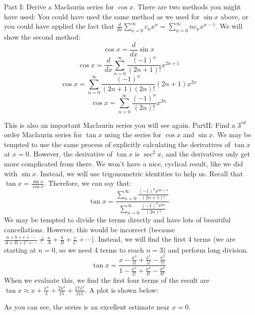 \begin{Answer}[ref = trigmac]
Part I: Derive a Maclaurin series for $\cos{x}$. There are two methods you 
might have used: You could have used the same method as we used for $\sin{x}$ 
above, or you could have applied the fact that $\frac{d}{dx} \sum_{n=0}^\infty 
c_n x^n = \sum_{n=0}^\infty n c_n x^{n - 1}$. We will show the second method:
$$\cos{x} = \frac{d}{dx} \sin{x}$$
$$\cos{x} = \frac{d}{dx} \sum_{n=0}^\infty \frac{(-1)^n}{(2n + 1)!}x^{2n + 1}$$
$$\cos{x} = \sum_{n=0}^\infty \frac{(-1)^n}{(2n + 1)(2n)!} \left(2n + 1 
\right) x^{2n}$$ 
$$\cos{x} = \sum_{n=0}^\infty \frac{(-1)^n}{(2n)!}x^{2n}$$

This is also an important Maclaurin series you will see again. 
PartII: Find a $3^{rd}$ order Maclaurin series for $\tan{x}$ using the series 
for $\cos{x}$ and $\sin{x}$. We may be tempted to use the same process of 
explicitly calculating the derivatives of $\tan{x}$ at $x = 0$. However, the 
derivative of $\tan{x}$ is $\sec^2{x}$, and the derivatives only get more 
complicated from there. We won't have a nice, cyclical result, like we did 
with $\sin{x}$. Instead, we will use trigonometric identities to help us. 
Recall that $\tan{x} = \frac{\sin{x}}{\cos{x}}$. Therefore, we can say that:
$$\tan{x} = \frac{\sum_{n=0}^\infty \frac{(-1)^n x^{2n + 1}}{(2n + 1)!}}{\sum_{
n = 0}^\infty \frac{(-1)^n x^{2n}}{(2n)!}}$$
We may be tempted to divide the terms directly and have lots of beautiful 
cancellations. However, this would be incorrect (because $\frac{a + b + c + 
\cdots}{A + B + C + \cdots} \neq \frac{a}{A} + \frac{b}{B} + \frac{c}{C} + 
\cdots$). Instead, we will find the first 4 terms (we are starting at $n = 0$, 
so we need 4 terms to reach $n = 3$) and perform long division. 
$$\tan{x} = \frac{x - \frac{x^3}{3!} + \frac{x^5}{5!} - \frac{x^7}{7!}}{1 - 
\frac{x^2}{2!} + \frac{x^4}{4!} - \frac{x^6}{6!}}$$
When we evaluate this, we find the first four terms of the result are $\tan{x} 
\approx x + \frac{x^3}{3} + \frac{2x^5}{15} + \frac{17x^7}{315}$. A plot is 
shown below:

\centering
As you can see, the series is an excellent estimate near $x = 0$. 
\end{Answer}

